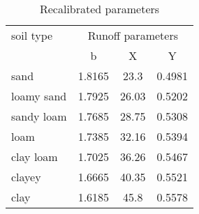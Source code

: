 \begin{table}[htbp]
  \centering
  \caption{Recalibrated parameters \citep{KavkaDisertace}}
    \begin{tabular}{lccc}
    \hline 
     soil type   &  \multicolumn{3}{c}{Runoff parameters}\\
     & \multicolumn{1}{c}{b} & \multicolumn{1}{c}{X} & \multicolumn{1}{c}{Y} \\
    \hline     
    \hline     
    sand & 1.8165 & 23.3  & 0.4981 \\
    loamy sand & 1.7925 & 26.03 & 0.5202 \\
    sandy loam & 1.7685 & 28.75 & 0.5308 \\
    loam & 1.7385 & 32.16 & 0.5394 \\
    clay loam & 1.7025 & 36.26 & 0.5467 \\
    clayey & 1.6665 & 40.35 & 0.5521 \\
    clay   & 1.6185 & 45.8  & 0.5578 \\
    \hline  
    \end{tabular}%
  \label{tab:addlabel}%
\end{table}%
 